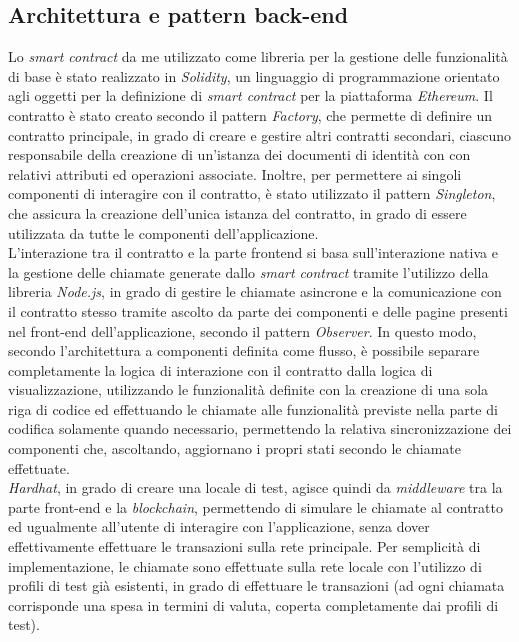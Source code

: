 \subsection{Architettura e pattern back-end}
Lo \textit{smart contract} da me utilizzato come libreria per la gestione delle funzionalità di base è stato realizzato in \textit{Solidity}, un linguaggio di programmazione
orientato agli oggetti per la definizione di \textit{smart contract} per la piattaforma \textit{Ethereum}. 
Il contratto è stato creato secondo il pattern \textit{Factory}, che permette di definire un contratto principale, in grado di creare e gestire altri contratti secondari,
ciascuno responsabile della creazione di un'istanza dei documenti di identità con  con relativi attributi ed operazioni associate.
Inoltre, per permettere ai singoli componenti di interagire con il contratto, è stato utilizzato il pattern \textit{Singleton}, che assicura la creazione dell'unica istanza
del contratto, in grado di essere utilizzata da tutte le componenti dell'applicazione. \\

L'interazione tra il contratto e la parte frontend si basa sull'interazione nativa e la gestione delle chiamate generate dallo \textit{smart contract} tramite l'utilizzo
della libreria \textit{Node.js}, in grado di gestire le chiamate asincrone e la comunicazione con il contratto stesso tramite ascolto da parte dei componenti e delle pagine
presenti nel front-end dell'applicazione, secondo il pattern \textit{Observer}. 
In questo modo, secondo l'architettura a componenti definita come flusso, è possibile separare completamente la logica di interazione con il contratto dalla logica di visualizzazione,
utilizzando le funzionalità definite con la creazione di una sola riga di codice ed effettuando le chiamate alle funzionalità previste nella parte di codifica 
solamente quando necessario, permettendo la relativa sincronizzazione dei componenti che, ascoltando, aggiornano i propri stati secondo le chiamate effettuate. \\

\textit{Hardhat}, in grado di creare una locale di test, agisce quindi da \textit{middleware} tra la parte front-end e la \textit{blockchain}, permettendo di simulare le chiamate al contratto
ed ugualmente all'utente di interagire con l'applicazione, senza dover effettivamente effettuare le transazioni sulla rete principale.
Per semplicità di implementazione, le chiamate sono effettuate sulla rete locale con l'utilizzo di profili di test già esistenti, in grado di effettuare le transazioni (ad ogni chiamata
corrisponde una spesa in termini di valuta, coperta completamente dai profili di test). \\

